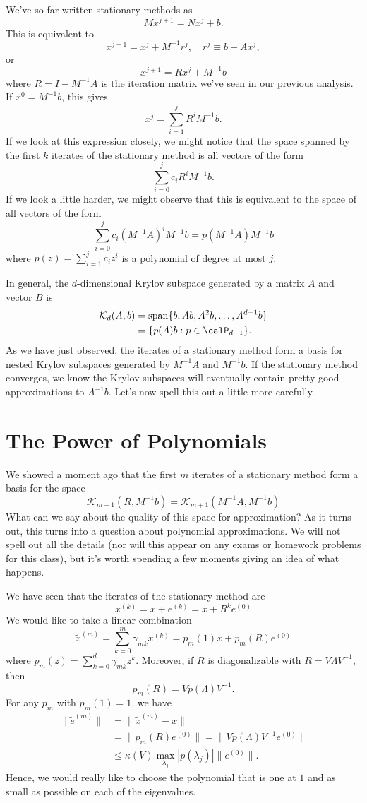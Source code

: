 \documentclass[12pt, leqno]{article}
\newcommand{\calK}{\mathcal{K}}
\begin{document}
We've so far written stationary methods as
\[
  M x^{j+1} = N x^j + b.
\]
This is equivalent to
\[
  x^{j+1} = x^j + M^{-1} r^j, \quad r^j \equiv b-Ax^j,
\]
or
\[
  x^{j+1} = R x^j + M^{-1} b
\]
where $R = I-M^{-1} A$ is the iteration matrix we've seen
in our previous analysis.  If $x^0 = M^{-1} b$, this gives
\[
  x^j = \sum_{i=1}^j R^i M^{-1} b.
\]
If we look at this expression closely, we might notice that
the space spanned by the first $k$ iterates of the stationary
method is all vectors of the form
\[
  \sum_{i=0}^j c_i R^i M^{-1} b.
\]
If we look a little harder, we might observe that this is equivalent
to the space of all vectors of the form
\[
  \sum_{i=0}^j c_i (M^{-1} A)^i M^{-1} b = p(M^{-1} A) M^{-1} b
\]
where $p(z) = \sum_{i=1}^j c_i z^i$ is a polynomial of degree at most
$j$.

In general, the $d$-dimensional Krylov subspace generated by
a matrix $A$ and vector $B$ is
\begin{align*}
  \calK_d(A,b)
  &= \operatorname{span}\{ b, Ab, A^2 b, \ldots, A^{d-1} b \} \\
  &= \{ p(A) b : p \in \calP_{d-1} \}.
\end{align*}
As we have just observed, the iterates of a stationary method
form a basis for nested Krylov subspaces generated by $M^{-1}A$
and $M^{-1}b$.  If the stationary method converges, we know
the Krylov subspaces will eventually contain pretty good
approximations to $A^{-1} b$.  Let's now spell this out a little
more carefully.

\section{The Power of Polynomials}

We showed a moment ago that the first $m$ iterates of a stationary
method form a basis for the space
\[
  \calK_{m+1}(R, M^{-1}b) = \calK_{m+1}(M^{-1} A, M^{-1} b)
\]
What can we say about the quality of this space for approximation?  As
it turns out, this turns into a question about polynomial
approximations.  We will not spell out all the details (nor will this
appear on any exams or homework problems for this class), but it's
worth spending a few moments giving an idea of what happens.

We have seen that the iterates of the stationary method are
\[
  x^{(k)} = x + e^{(k)} = x + R^k e^{(0)}
\]
We would like to take a linear combination
\[
  \tilde x^{(m)} = \sum_{k=0}^m \gamma_{mk} x^{(k)} = p_m(1) x + p_m(R) e^{(0)}
\]
where $p_m(z) = \sum_{k=0}^d \gamma_{mk} z^k$.  Moreover,
if $R$ is diagonalizable with $R = V \Lambda V^{-1}$, then
\[
  p_m(R) = V p(\Lambda) V^{-1}.
\]
For any $p_m$ with $p_m(1) = 1$, we have
\begin{align*}
\|\tilde{e}^{(m)}\|
&= \|\tilde{x}^{(m)}-x\| \\
&= \|p_m(R) e^{(0)}\| = \|V p(\Lambda) V^{-1} e^{(0)}\| \\
&\leq \kappa(V) \max_{\lambda_j} |p(\lambda_j)| \|e^{(0)}\|.
\end{align*}
Hence, we would really like to choose the polynomial that is one
at $1$ and as small as possible on each of the eigenvalues.
\end{document}
